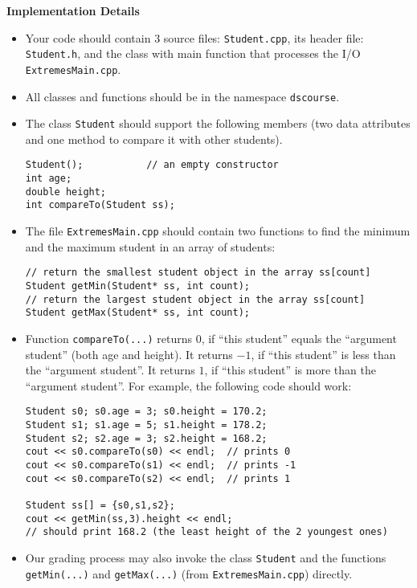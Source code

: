 \documentclass[11pt]{article}
\begin{document}
\vspace{10pt}
{\bf Implementation Details}

\begin{itemize}
\item Your code should contain $3$ source files: {\tt Student.cpp},
its header file: {\tt Student.h}, 
and the class with main function that processes the I/O
{\tt ExtremesMain.cpp}. 
\item All classes and functions should be in the 
namespace {\tt ds\textunderscore{}course}.
\item The class {\tt Student} should support the
following members (two data attributes and one method to compare it with other students).
\begin{verbatim}
Student();           // an empty constructor
int age;
double height;
int compareTo(Student ss); 
\end{verbatim}
\item The file {\tt ExtremesMain.cpp} should contain two functions to find the 
minimum and the maximum student in an array of students: 
\begin{verbatim}
// return the smallest student object in the array ss[count]
Student getMin(Student* ss, int count);
// return the largest student object in the array ss[count]
Student getMax(Student* ss, int count);
\end{verbatim}
\item
Function {\tt compareTo(...)} returns $0$, if ``this student'' 
equals the ``argument student'' (both age and height). 
It returns $-1$, if ``this student''  is less than the
``argument student''. It returns $1$, if ``this student'' is more
than the ``argument student''. For example, the following code should work:
\begin{verbatim}
Student s0; s0.age = 3; s0.height = 170.2;
Student s1; s1.age = 5; s1.height = 178.2;
Student s2; s2.age = 3; s2.height = 168.2;
cout << s0.compareTo(s0) << endl;  // prints 0
cout << s0.compareTo(s1) << endl;  // prints -1
cout << s0.compareTo(s2) << endl;  // prints 1

Student ss[] = {s0,s1,s2};
cout << getMin(ss,3).height << endl; 
// should print 168.2 (the least height of the 2 youngest ones)
\end{verbatim}
\item Our grading process may also invoke the 
class {\tt Student}
and the functions 
{\tt getMin(...)} and 
{\tt getMax(...)} (from {\tt ExtremesMain.cpp}) directly.
\end{itemize}
\end{document}
